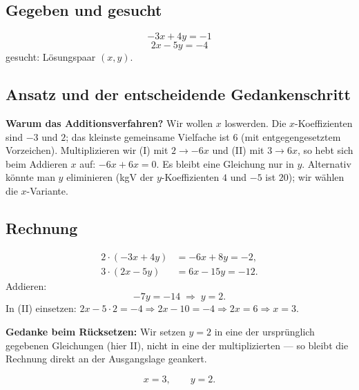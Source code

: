 

\subsection*{Gegeben und gesucht}
\begin{equation}
  -3x+4y=-1 \tag{I}
\end{equation}
\begin{equation}
  2x-5y=-4 \tag{II}
\end{equation}
gesucht: Lösungspaar $(x,y)$.

\subsection*{Ansatz und der entscheidende Gedankenschritt}
\textbf{Warum das Additionsverfahren?} Wir wollen $x$ loswerden. Die
$x$-Koeffizienten sind $-3$ und $2$; das kleinste gemeinsame Vielfache
ist $6$ (mit entgegengesetztem Vorzeichen). Multiplizieren wir (I) mit
$2\to -6x$ und (II) mit $3\to 6x$, so hebt sich beim Addieren $x$ auf:
$-6x+6x=0$. Es bleibt eine Gleichung nur in $y$.
Alternativ könnte man $y$ eliminieren (kgV der $y$-Koeffizienten $4$ und
$-5$ ist $20$); wir wählen die $x$-Variante.

\subsection*{Rechnung}
\begin{align}
  2\cdot(-3x+4y) &= -6x+8y=-2, \\[2pt]
  3\cdot(2x-5y) &= 6x-15y=-12 .
\end{align}
Addieren:
\begin{equation}
  -7y=-14 \;\Longrightarrow\; y=2 .
\end{equation}
In (II) einsetzen: $2x-5\cdot2=-4 \Rightarrow 2x-10=-4\Rightarrow 2x=6
\Rightarrow x=3$.

\textbf{Gedanke beim Rücksetzen:} Wir setzen $y=2$ in eine der
ursprünglich gegebenen Gleichungen (hier II), nicht in eine der
multiplizierten --- so bleibt die Rechnung direkt an der Ausgangslage
geankert.

\begin{ergebnis}
\begin{equation*}
  x=3,\qquad y=2 .
\end{equation*}
\end{ergebnis}

